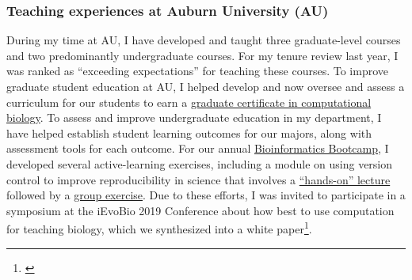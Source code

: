 \subsubsection*{Teaching experiences at Auburn University (AU)}
During my time at AU,
I have developed and taught three graduate-level courses
and two predominantly undergraduate courses.
For my tenure review last year, I was ranked as ``exceeding
expectations'' for teaching these courses.
To improve graduate student education at AU,
I helped develop and now oversee and assess a curriculum for our students to
earn a
\href{http://bulletin.auburn.edu/thegraduateschool/graduatedegreesoffered/biologicalsciencesmsphd_major/computationalbiology_gradcert/}{graduate certificate in computational biology}.
To assess and improve undergraduate education in my department, I have helped
establish student learning outcomes for our majors, along with assessment tools
for each outcome.
For our annual
\href{http://www.auburn.edu/cosam/bioinformatics/}{Bioinformatics Bootcamp},
I developed several active-learning exercises,
including a module on using version control to improve reproducibility in
science that involves a
\href{http://phyletica.org/slides/git-intro/}{``hands-on'' lecture}
followed by a
\href{https://github.com/joaks1/au-bootcamp-git-intro}{group exercise}.
Due to these efforts, I was invited to participate in a symposium at the
iEvoBio 2019 Conference about how best to use computation for teaching biology,
which we synthesized into a
white paper\footnote{\label{ievobiopaper}}.


